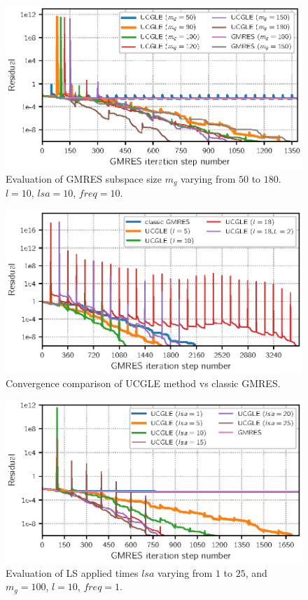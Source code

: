 \begin{figure}[htbp]
	\centering
	\includegraphics[width=6.2in]{fig/conv_ksp_gmres.eps}
	\caption{Evaluation of GMRES subspace size $m_g$ varying from $50$ to $180$. $l=10$, $lsa=10$, $freq=10$.}
	\label{fig:krylovsubspace}
\end{figure}

\begin{figure}[htbp]
	\centering
	\includegraphics[width=6.2in]{fig/conv_power.eps}
	\caption{Convergence comparison of UCGLE method vs classic GMRES.}
	\label{fig:lsdegree}
\end{figure}

\begin{figure}[htbp]
	\centering
	\includegraphics[width=6.2in]{fig/conv_lsappied.eps}
	\caption{Evaluation of LS applied times $lsa$ varying from $1$ to $25$, and $m_g=100$, $l=10$, $freq=1$. }
	\label{fig:Lsappliedtime}
\end{figure}

